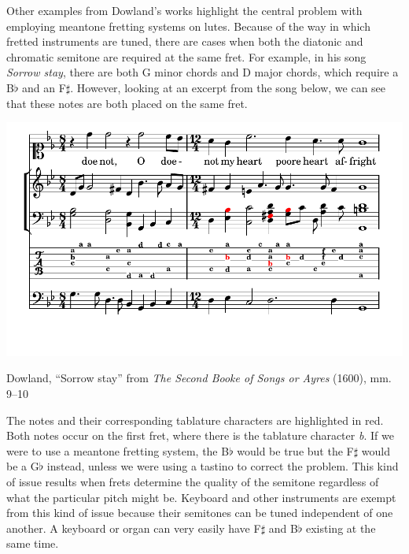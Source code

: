 Other examples from Dowland's works highlight the central problem with employing meantone fretting
systems on lutes. Because of the way in which fretted instruments are tuned, there are cases when
both the diatonic and chromatic semitone are required at the same fret. For example, in his song
\textit{Sorrow stay}, there are both G minor chords and D major chords, which require a
B$\flat$ and an F$\sharp$. However, looking at an excerpt from the song below, we can see that
these notes are both placed on the same fret.
\begin{example}[h]
\centering
\includegraphics[trim=0in 0.75in 0in 0in,clip=true,width=\textwidth]{examples/saw.pdf}
\label{dowland-saw}
\caption{Dowland, ``Sorrow stay'' from \textit{The Second Booke of Songs or Ayres} (1600), mm. 9--10}
\end{example}
The notes and their corresponding tablature characters are highlighted in red. Both
notes occur on the first fret, where there is the tablature character \textit{b}. If
we were to use a meantone fretting system, the B$\flat$ would be true but the F$\sharp$
would be a G$\flat$ instead, unless we were using a tastino to correct the problem.
This kind of issue results when frets determine the quality of the semitone regardless
of what the particular pitch might be. Keyboard and other instruments are exempt from
this kind of issue because their semitones can be tuned independent of one another. A
keyboard or organ can very easily have F$\sharp$ and B$\flat$ existing at the same time.

